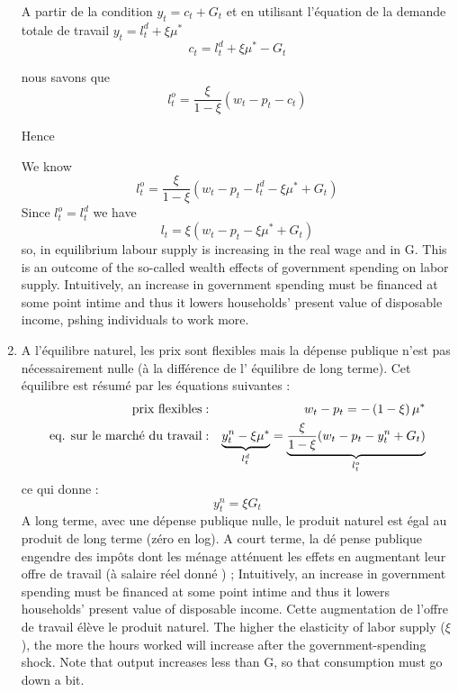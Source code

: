 \documentclass[a4paper,11pt]{article}
\begin{document}
\begin{enumerate}
A partir de la condition $ y_t = c_t + G_t $ et en utilisant l'équation de la demande totale de travail $y_{t}= l_t^d + \xi \mu ^{\ast }$
\begin{equation*}
c_{t}= l_t^d + \xi \mu ^{\ast }-G_t
\end{equation*}



nous savons que \begin{equation*}
l_{t}^{o}=\frac{\xi}{1-\xi}(w_{t}-p_{t}-c_{t}) 
\end{equation*}

Hence

We know \begin{equation*}
l_{t}^{o}=\frac{\xi}{1-\xi}(w_{t}-p_{t}- l_t^d - \xi \mu ^{\ast }+G_t) 
\end{equation*}
Since $l_t^o=l_t^d$ we have \begin{equation*}
l_{t}=\xi(w_{t}-p_{t}- \xi \mu ^{\ast }+G_t) 
\end{equation*}
so, in equilibrium labour supply is increasing in the real wage and in G.
 This is an outcome of the so-called wealth effects of government spending on labor supply. Intuitively, an increase in government spending must be financed at some point intime and thus it lowers households’ present value of disposable income, pshing individuals to work more. 

\item A l'\'{e}quilibre naturel, les prix sont flexibles mais la d\'{e}pense
publique n'est pas n\'{e}cessairement nulle (\`{a} la diff\'{e}rence de l'%
\'{e}quilibre de long terme). Cet \'{e}quilibre est r\'{e}sum\'{e} par les 
\'{e}quations suivantes :%
\begin{eqnarray*}
\text{prix flexibles} &:&w_{t}-p_{t}=-\left( 1-\xi \right) \mu ^{\ast } \\
\text{eq. sur le march\'{e} du travail} &:&\underset{l_{t}^{d}}{\underbrace{%
y_{t}^{n}-\xi \mu ^{\ast }}}=\underset{l_{t}^{o}}{\underbrace{\frac{\xi }{%
1-\xi }(w_{t}-p_{t}-y_{t}^{n}+G_{t})}}
\end{eqnarray*}%
ce qui donne :%
\begin{equation*}
y_{t}^{n}=\xi G_{t}
\end{equation*}%
A long terme, avec une d\'{e}pense publique nulle, le produit naturel est 
\'{e}gal au produit de long terme (z\'{e}ro en log). A court terme, la d\'{e}%
pense publique engendre des imp\^{o}ts dont les m\'{e}nage att\'{e}nuent les
effets en augmentant leur offre de travail (\`{a} salaire r\'{e}el donn\'{e}%
) ; Intuitively, an increase in government spending must be financed at some point intime and thus it lowers households’ present value of disposable income. Cette augmentation de l'offre de travail \'{e}l\`{e}ve le produit
naturel.  The  higher the elasticity of labor supply ($\xi$), the more the hours worked will increase after the government-spending shock. Note that output increases less than G, so that consumption must go down a bit. 


\end{enumerate}
\end{document}
